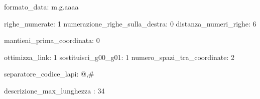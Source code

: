 formato_data: m.g.aaaa

righe_numerate:                 1
numerazione_righe_sulla_destra: 0
distanza_numeri_righe:          6

mantieni_prima_coordinata:      0

ottimizza_link:              1
sostituisci_g00_g01:         1
numero_spazi_tra_coordinate: 2

separatore_codice_lapi: @,#

descrizione_max_lunghezza : 34